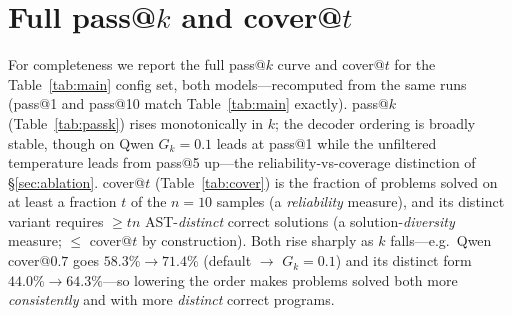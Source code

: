 \documentclass[11pt]{article}                       %
\begin{document}
\section{Full pass@\texorpdfstring{$k$}{k} and cover@\texorpdfstring{$t$}{t}}\label{app:passk}
For completeness we report the full pass@$k$ curve and cover@$t$ for the Table~\ref{tab:main} config
set, both models---recomputed from the same runs (pass@1 and pass@10 match Table~\ref{tab:main}
exactly). pass@$k$ (Table~\ref{tab:passk}) rises monotonically in $k$; the decoder ordering is broadly
stable, though on Qwen $G_k{=}0.1$ leads at pass@1 while the unfiltered temperature leads from pass@5
up---the reliability-vs-coverage distinction of \S\ref{sec:ablation}. cover@$t$ (Table~\ref{tab:cover})
is the fraction of problems solved on at least a fraction $t$ of the $n{=}10$ samples (a
\emph{reliability} measure), and its distinct variant requires $\ge tn$ AST-\emph{distinct} correct
solutions (a solution-\emph{diversity} measure; $\le$ cover@$t$ by construction). Both rise sharply as
$k$ falls---e.g.\ Qwen cover@$0.7$ goes $58.3\%\!\to\!71.4\%$ (default $\to$ $G_k{=}0.1$) and its
distinct form $44.0\%\!\to\!64.3\%$---so lowering the order makes problems solved both more
\emph{consistently} and with more \emph{distinct} correct programs.
\end{document}
